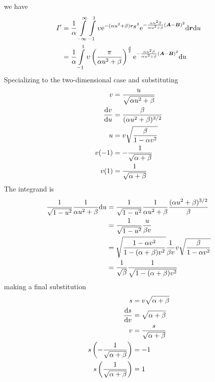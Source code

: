     we have
        \begin{align}
            I' &= \frac{1}{\alpha}\int\limits^{\infty}_{-\infty} \int\limits^1_{-1} \upsilon \mathrm{e}^{-(\alpha u^2 +
            \beta)\boldsymbol{{r_S}}^2} \mathrm{e}^{-\frac{\alpha u^2\beta}{\alpha u^2 +
            \beta} (\boldsymbol{{A}}-\boldsymbol{{B}})^2} \mathrm{d}\boldsymbol{{r}}\mathrm{d} u \nonumber \\
            &= \frac{1}{\alpha}\int\limits^1_{-1} \upsilon
            \left(\frac{\pi}{\alpha u^2 + \beta}\right)^{\frac{d}{2}}
            \mathrm{e}^{-\frac{\alpha u^2\beta}{\alpha u^2 +
            \beta}(\boldsymbol{{A}}-\boldsymbol{{B}})^2} \mathrm{d} u
        \end{align}
    Specializing to the two-dimensional case and substituting
        \begin{equation}
            \begin{aligned}
                v &= \frac{u}{\sqrt{\alpha u^2 + \beta}} \\
                \frac{\mathrm{d} v}{\mathrm{d} u} &= \frac{\beta}{(\alpha u^2 + \beta)^{3/2}}
                \\
                u &= v \sqrt{\frac{\beta}{1 - \alpha v^2}} \\
                v(-1) &= -\frac{1}{\sqrt{\alpha + \beta}} \\
                v(1) &= \frac{1}{\sqrt{\alpha + \beta}}
            \end{aligned}
        \end{equation}
    The integrand is
        \begin{align}
            \frac{1}{\sqrt{1 - u^2}} \frac{1}{\alpha u^2 + \beta} \mathrm{d} u &=
            \frac{1}{\sqrt{1-u^2}} \frac{1}{\alpha u^2 + \beta} \frac{(\alpha
            u^2 + \beta)^{3/2}}{\beta} \nonumber \\
            &= \frac{1}{\sqrt{1-u^2}} \frac{u}{\beta v} \nonumber \\
            &= \sqrt{\frac{1-\alpha v^2}{1-(\alpha+\beta)v^2}}\frac{1}{\beta
            v}v\sqrt{\frac{\beta}{1-\alpha v^2}} \nonumber \\
            &= \frac{1}{\sqrt{\beta}} \frac{1}{\sqrt{1 - (\alpha+\beta)v^2}}
        \end{align}
    making a final substitution
        \begin{equation}
            \begin{aligned}
                s &= v\sqrt{\alpha+\beta} \\
                \frac{\mathrm{d} s}{\mathrm{d} v} &= \sqrt{\alpha + \beta}\\
                v &= \frac{s}{\sqrt{\alpha+\beta}} \\
                s\left(-\frac{1}{\sqrt{\alpha+\beta}}\right) &= -1 \\
                s\left(\frac{1}{\sqrt{\alpha+\beta}}\right) &= 1 \\
            \end{aligned}
        \end{equation}
